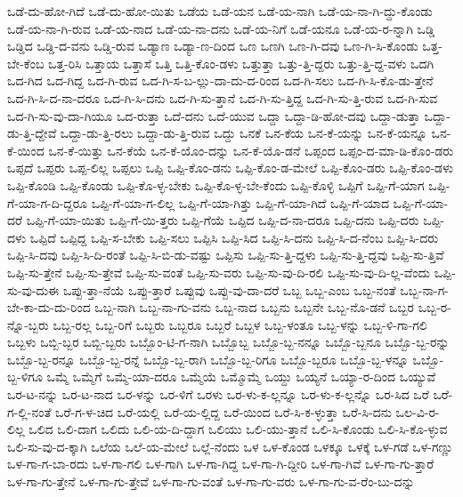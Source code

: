 {ಒಡೆ-ದು-ಹೋ-ಗಿದೆ
ಒಡೆ-ದು-ಹೋ-ಯಿತು
ಒಡೆಯ
ಒಡೆ-ಯನ
ಒಡೆ-ಯ-ನಾಗಿ
ಒಡೆ-ಯ-ನಾ-ಗಿ-ದ್ದು-ಕೊಂಡು
ಒಡೆ-ಯ-ನಾ-ಗಿ-ರುವ
ಒಡೆ-ಯ-ನಾದ
ಒಡೆ-ಯ-ನಾ-ದನು
ಒಡೆ-ಯ-ನಿಗೆ
ಒಡೆ-ಯನೂ
ಒಡೆ-ಯ-ರ-ನ್ನಾಗಿ
ಒಡ್ಡಿ
ಒಡ್ಡಿದ
ಒಡ್ಡಿ-ದ-ವನು
ಒಡ್ಡಿ-ರುವ
ಒಡ್ಯಾಣ
ಒಡ್ಯಾ-ಣ-ದಿಂದ
ಒಣ
ಒಣಗಿ
ಒಣ-ಗಿ-ದವು
ಒಣ-ಗಿ-ಸಿ-ಕೊಂಡು
ಒತ್ತ-ಬೇ-ಕೆಂಬ
ಒತ್ತ-ರಿಸಿ
ಒತ್ತಾಯ
ಒತ್ತಾಸೆ
ಒತ್ತಿ
ಒತ್ತಿ-ಕೊಂ-ಡಳು
ಒತ್ತುತ್ತಾ
ಒತ್ತು-ತ್ತಿ-ದ್ದರು
ಒತ್ತು-ತ್ತಿ-ದ್ದ-ವಳು
ಒದಗಿ
ಒದ-ಗಿದ
ಒದ-ಗಿದ್ದ
ಒದ-ಗಿ-ರುವ
ಒದ-ಗಿ-ಸ-ಬ-ಲ್ಲು-ದಾ-ದು-ದ-ರಿಂದ
ಒದ-ಗಿ-ಸಲು
ಒದ-ಗಿ-ಸಿ-ಕೊ-ಡು-ತ್ತೇನೆ
ಒದ-ಗಿ-ಸಿ-ದ-ನಾ-ದರೂ
ಒದ-ಗಿ-ಸಿ-ದನು
ಒದ-ಗಿ-ಸು-ತ್ತಾನೆ
ಒದ-ಗಿ-ಸು-ತ್ತಿದ್ದ
ಒದ-ಗಿ-ಸು-ತ್ತಿ-ರುವ
ಒದ-ಗಿ-ಸುವ
ಒದ-ಗಿ-ಸು-ವು-ದಾ-ಗಿಯೂ
ಒದ-ರುತ್ತಾ
ಒದೆ-ದನು
ಒದೆ-ಯುವ
ಒದ್ದಾ
ಒದ್ದಾ-ಡಿ-ಹೋ-ದವು
ಒದ್ದಾ-ಡುತ್ತಾ
ಒದ್ದಾ-ಡು-ತ್ತಿ-ದ್ದೇವೆ
ಒದ್ದಾ-ಡು-ತ್ತಿ-ರಲು
ಒದ್ದಾ-ಡು-ತ್ತಿ-ರುವ
ಒದ್ದು
ಒನಕೆ
ಒನ-ಕೆಯ
ಒನ-ಕೆ-ಯನ್ನು
ಒನ-ಕೆ-ಯನ್ನೂ
ಒನ-ಕೆ-ಯಿಂದ
ಒನ-ಕೆ-ಯಿತ್ತು
ಒನ-ಕೆಯೆ
ಒನ-ಕೆ-ಯೊಂ-ದನ್ನು
ಒನ-ಕೆ-ಯೊ-ಡನೆ
ಒಪ್ಪಂದ
ಒಪ್ಪಂ-ದ-ಮಾ-ಡಿ-ಕೊಂ-ಡರು
ಒಪ್ಪದೆ
ಒಪ್ಪರು
ಒಪ್ಪ-ಲಿಲ್ಲ
ಒಪ್ಪಲು
ಒಪ್ಪಿ
ಒಪ್ಪಿ-ಕೊಂ-ಡನು
ಒಪ್ಪಿ-ಕೊಂ-ಡ-ಮೇಲೆ
ಒಪ್ಪಿ-ಕೊಂ-ಡರು
ಒಪ್ಪಿ-ಕೊಂ-ಡಳು
ಒಪ್ಪಿ-ಕೊಂಡಿ
ಒಪ್ಪಿ-ಕೊಂಡು
ಒಪ್ಪಿ-ಕೊ-ಳ್ಳ-ಬೇಕು
ಒಪ್ಪಿ-ಕೊ-ಳ್ಳ-ಬೇ-ಕೆಂದು
ಒಪ್ಪಿ-ಕೊಳ್ಳಿ
ಒಪ್ಪಿಗೆ
ಒಪ್ಪಿ-ಗೆ-ಯಾಗ
ಒಪ್ಪಿ-ಗೆ-ಯಾ-ಗ-ದಿ-ದ್ದರೂ
ಒಪ್ಪಿ-ಗೆ-ಯಾ-ಗ-ಲಿಲ್ಲ
ಒಪ್ಪಿ-ಗೆ-ಯಾ-ಗಿತ್ತು
ಒಪ್ಪಿ-ಗೆ-ಯಾ-ಗಿದೆ
ಒಪ್ಪಿ-ಗೆ-ಯಾದ
ಒಪ್ಪಿ-ಗೆ-ಯಾ-ದರೆ
ಒಪ್ಪಿ-ಗೆ-ಯಾ-ಯಿತು
ಒಪ್ಪಿ-ಗೆ-ಯಿ-ತ್ತರು
ಒಪ್ಪಿ-ಗೆಯೆ
ಒಪ್ಪಿದ
ಒಪ್ಪಿ-ದ-ನಾ-ದರೂ
ಒಪ್ಪಿ-ದನು
ಒಪ್ಪಿ-ದರು
ಒಪ್ಪಿ-ದಳು
ಒಪ್ಪಿದೆ
ಒಪ್ಪಿದ್ದ
ಒಪ್ಪಿ-ಸ-ಬೇಕು
ಒಪ್ಪಿ-ಸಲು
ಒಪ್ಪಿಸಿ
ಒಪ್ಪಿ-ಸಿದ
ಒಪ್ಪಿ-ಸಿ-ದನು
ಒಪ್ಪಿ-ಸಿ-ದ-ನೆಂಬ
ಒಪ್ಪಿ-ಸಿ-ದರು
ಒಪ್ಪಿ-ಸಿ-ದವು
ಒಪ್ಪಿ-ಸಿ-ದಿ-ರಂತೆ
ಒಪ್ಪಿ-ಸಿ-ಬಿ-ಡು-ವಷ್ಟು
ಒಪ್ಪಿಸು
ಒಪ್ಪಿ-ಸು-ತ್ತಿ-ದ್ದಳು
ಒಪ್ಪಿ-ಸು-ತ್ತಿ-ದ್ದವು
ಒಪ್ಪಿ-ಸು-ತ್ತಿವೆ
ಒಪ್ಪಿ-ಸು-ತ್ತೇನೆ
ಒಪ್ಪಿ-ಸು-ತ್ತೇವೆ
ಒಪ್ಪಿ-ಸು-ವಂತೆ
ಒಪ್ಪಿ-ಸು-ವರು
ಒಪ್ಪಿ-ಸು-ವು-ದಿ-ರಲಿ
ಒಪ್ಪಿ-ಸು-ವು-ದಿ-ಲ್ಲ-ವೆಂದು
ಒಪ್ಪಿ-ಸು-ವು-ದುಈ
ಒಪ್ಪು-ತ್ತಾ-ನೆಯೆ
ಒಪ್ಪು-ತ್ತಾರೆ
ಒಪ್ಪುವು
ಒಪ್ಪು-ವು-ದಾ-ದರೆ
ಒಬ್ಬ
ಒಬ್ಬ-ಎಂಬ
ಒಬ್ಬ-ನಂತೆ
ಒಬ್ಬ-ನಾ-ಗ-ಬೇ-ಕಾ-ದು-ದು-ರಿಂದ
ಒಬ್ಬ-ನಾಗಿ
ಒಬ್ಬ-ನಾ-ಗು-ವನು
ಒಬ್ಬ-ನಾದ
ಒಬ್ಬನು
ಒಬ್ಬನೇ
ಒಬ್ಬ-ನೊ-ಡನೆ
ಒಬ್ಬರ
ಒಬ್ಬ-ರ-ನ್ನೊ-ಬ್ಬರು
ಒಬ್ಬ-ರಲ್ಲ
ಒಬ್ಬ-ರಿಗೆ
ಒಬ್ಬರು
ಒಬ್ಬರೂ
ಒಬ್ಬರೆ
ಒಬ್ಬಳ
ಒಬ್ಬ-ಳಂತೂ
ಒಬ್ಬ-ಳನ್ನು
ಒಬ್ಬ-ಳಿ-ಗಾ-ಗಲಿ
ಒಬ್ಬಳು
ಒಬ್ಬಿ-ಬ್ಬರ
ಒಬ್ಬಿ-ಬ್ಬರು
ಒಬ್ಬೊಂ-ಟಿ-ಗ-ನಾಗಿ
ಒಬ್ಬೊಬ್ಬ
ಒಬ್ಬೊ-ಬ್ಬ-ನನ್ನೂ
ಒಬ್ಬೊ-ಬ್ಬನೂ
ಒಬ್ಬೊ-ಬ್ಬ-ರನ್ನು
ಒಬ್ಬೊ-ಬ್ಬ-ರನ್ನೂ
ಒಬ್ಬೊ-ಬ್ಬ-ರನ್ನೆ
ಒಬ್ಬೊ-ಬ್ಬ-ರಾಗಿ
ಒಬ್ಬೊ-ಬ್ಬ-ರಿಗೂ
ಒಬ್ಬೊ-ಬ್ಬರೂ
ಒಬ್ಬೊ-ಬ್ಬ-ಳನ್ನೂ
ಒಬ್ಬೊ-ಬ್ಬ-ಳಿಗೂ
ಒಮ್ಮೆ
ಒಮ್ಮೆಗೆ
ಒಮ್ಮೆ-ಯಾ-ದರೂ
ಒಮ್ಮೆಯೆ
ಒಮ್ಮೊಮ್ಮೆ
ಒಯ್ದು
ಒಯ್ಯನೆ
ಒಯ್ಯಾ-ರ-ದಿಂದ
ಒಯ್ಯುವೆ
ಒರ-ಟ-ನನ್ನು
ಒರ-ಟ-ನಾದ
ಒರ-ಳನ್ನು
ಒರ-ಳಿಗೆ
ಒರಳು
ಒರ-ಳು-ಕ-ಲ್ಲನ್ನೂ
ಒರ-ಳು-ಕ-ಲ್ಲನ್ನೊ
ಒರ-ಸಿದ
ಒರೆ
ಒರೆ-ಗ-ಲ್ಲಿ-ನಂತೆ
ಒರೆ-ಗ-ಳ-ಚಿದ
ಒರೆ-ಯಲ್ಲಿ
ಒರೆ-ಯ-ಲ್ಲಿದ್ದ
ಒರೆ-ಯಿಂದ
ಒರೆ-ಸಿ-ಕ-ಳ್ಳುತ್ತಾ
ಒರೆ-ಸಿ-ದನು
ಒಲ-ವಿ-ರ-ಲಿಲ್ಲ
ಒಲಿದ
ಒಲಿ-ದಾಗ
ಒಲಿದು
ಒಲಿ-ಯ-ದಿ-ದ್ದಾಗ
ಒಲಿಯು
ಒಲಿ-ಯು-ತ್ತಾನೆ
ಒಲಿ-ಸಿ-ಕೊಂಡು
ಒಲಿ-ಸಿ-ಕೊ-ಳ್ಳುವ
ಒಲಿ-ಸು-ವು-ದ-ಕ್ಕಾಗಿ
ಒಲೆಯ
ಒಲೆ-ಯ-ಮೇಲೆ
ಒಲ್ಲೆ-ನೆಂದು
ಒಳ
ಒಳ-ಕೊಂಡ
ಒಳಕ್ಕೂ
ಒಳಕ್ಕೆ
ಒಳ-ಗಡೆ
ಒಳ-ಗಣ್ಣು
ಒಳ-ಗಾ-ಗ-ಬಾ-ರದು
ಒಳ-ಗಾ-ಗಲಿ
ಒಳ-ಗಾಗಿ
ಒಳ-ಗಾ-ಗಿದ್ದ
ಒಳ-ಗಾ-ಗಿ-ದ್ದೀರಿ
ಒಳ-ಗಾ-ಗಿವೆ
ಒಳ-ಗಾ-ಗು-ತ್ತಾರೆ
ಒಳ-ಗಾ-ಗು-ತ್ತೇನೆ
ಒಳ-ಗಾ-ಗು-ತ್ತೇವೆ
ಒಳ-ಗಾ-ಗು-ವಂತೆ
ಒಳ-ಗಾ-ಗು-ವರು
ಒಳ-ಗಾ-ಗು-ವ-ರೆಂ-ಬು-ದನ್ನು
}
